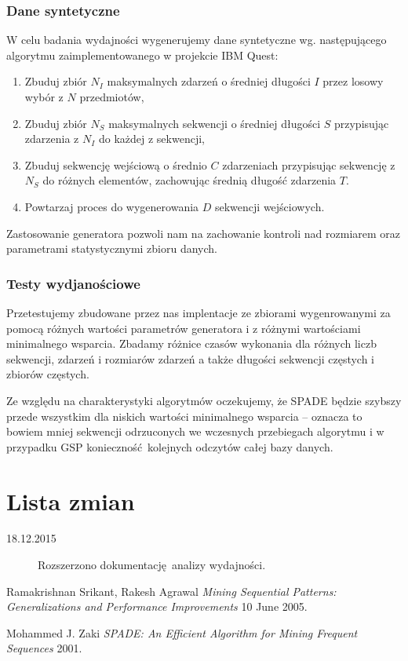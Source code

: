 \documentclass[paper=a4, fontsize=11pt]{scrartcl} %
\numberwithin{equation}{section} %
\numberwithin{figure}{section} %
\numberwithin{table}{section} %
\begin{document}
\subsubsection{Dane syntetyczne}
W celu badania wydajności wygenerujemy dane syntetyczne wg. następującego
algorytmu zaimplementowanego w projekcie IBM Quest:
\begin{enumerate}
    \item Zbuduj zbiór \( N_I \) maksymalnych zdarzeń o średniej długości \( I \)
          przez losowy wybór z \( N \) przedmiotów,
    \item Zbuduj zbiór \( N_S \) maksymalnych sekwencji o średniej długości \( S \)
          przypisując zdarzenia z \( N_I \) do każdej z sekwencji,
    \item Zbuduj sekwencję wejściową o średnio \( C \) zdarzeniach przypisując
          sekwencję z \( N_S \) do różnych elementów, zachowując średnią długość
          zdarzenia \( T \).
    \item Powtarzaj proces do wygenerowania \( D \) sekwencji wejściowych.
\end{enumerate}

Zastosowanie generatora pozwoli nam na zachowanie kontroli nad rozmiarem
oraz parametrami statystycznymi zbioru danych.

\subsubsection{Testy wydjanościowe}
Przetestujemy zbudowane przez nas implentacje ze zbiorami wygenrowanymi
za pomocą różnych wartości parametrów generatora i z różnymi wartościami minimalnego
wsparcia.  Zbadamy różnice czasów wykonania dla różnych liczb sekwencji,
zdarzeń i rozmiarów zdarzeń a także długości sekwencji częstych i zbiorów
częstych.

Ze względu na charakterystyki algorytmów oczekujemy, że SPADE będzie szybszy
przede wszystkim dla niskich wartości minimalnego wsparcia -- oznacza to
bowiem mniej sekwencji odrzuconych we wczesnych przebiegach algorytmu
i w przypadku GSP konieczność kolejnych odczytów całej bazy danych.

\appendix
\section{Lista zmian}

\begin{description}
    \item[18.12.2015] Rozszerzono dokumentację analizy wydajności.
\end{description}


\renewcommand{\refname}{Bibliografia}

  \begin{thebibliography}{1}

   Ramakrishnan Srikant, Rakesh Agrawal {\em Mining Sequential Patterns: Generalizations and Performance Improvements} 10 June 2005.

   Mohammed J. Zaki {\em SPADE: An Efficient Algorithm for Mining Frequent Sequences} 2001.

  \end{thebibliography}
\end{document}

